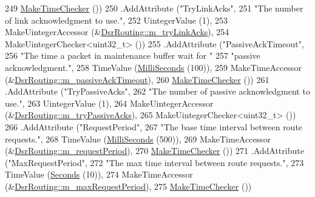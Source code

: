 \begin{DoxyCode}
249                    \hyperlink{group__time_ga7032965bd4afa578691d88c09e4481c1}{MakeTimeChecker} ())
250     .AddAttribute (\textcolor{stringliteral}{"TryLinkAcks"},
251                    \textcolor{stringliteral}{"The number of link acknowledgment to use."},
252                    UintegerValue (1),
253                    MakeUintegerAccessor (&\hyperlink{classns3_1_1dsr_1_1DsrRouting_acecdd106e259c448bcfa6a6cef901658}{DsrRouting::m\_tryLinkAcks}),
254                    MakeUintegerChecker<uint32\_t> ())
255     .AddAttribute (\textcolor{stringliteral}{"PassiveAckTimeout"},
256                    \textcolor{stringliteral}{"The time a packet in maintenance buffer wait for "}
257                    \textcolor{stringliteral}{"passive acknowledgment."},
258                    TimeValue (\hyperlink{group__timecivil_gaf26127cf4571146b83a92ee18679c7a9}{MilliSeconds} (100)),
259                    MakeTimeAccessor (&\hyperlink{classns3_1_1dsr_1_1DsrRouting_a6155bddae63f0e1fda8afbeebc25a54c}{DsrRouting::m\_passiveAckTimeout}),
260                    \hyperlink{group__time_ga7032965bd4afa578691d88c09e4481c1}{MakeTimeChecker} ())
261     .AddAttribute (\textcolor{stringliteral}{"TryPassiveAcks"},
262                    \textcolor{stringliteral}{"The number of passive acknowledgment to use."},
263                    UintegerValue (1),
264                    MakeUintegerAccessor (&\hyperlink{classns3_1_1dsr_1_1DsrRouting_aadd1dd676ec50cae94ffd6f2eefb277c}{DsrRouting::m\_tryPassiveAcks}),
265                    MakeUintegerChecker<uint32\_t> ())
266     .AddAttribute (\textcolor{stringliteral}{"RequestPeriod"},
267                    \textcolor{stringliteral}{"The base time interval between route requests."},
268                    TimeValue (\hyperlink{group__timecivil_gaf26127cf4571146b83a92ee18679c7a9}{MilliSeconds} (500)),
269                    MakeTimeAccessor (&\hyperlink{classns3_1_1dsr_1_1DsrRouting_acb19e2fe8a4cc1812181cdd5491383ee}{DsrRouting::m\_requestPeriod}),
270                    \hyperlink{group__time_ga7032965bd4afa578691d88c09e4481c1}{MakeTimeChecker} ())
271     .AddAttribute (\textcolor{stringliteral}{"MaxRequestPeriod"},
272                    \textcolor{stringliteral}{"The max time interval between route requests."},
273                    TimeValue (\hyperlink{group__timecivil_ga33c34b816f8ff6628e33d5c8e9713b9e}{Seconds} (10)),
274                    MakeTimeAccessor (&\hyperlink{classns3_1_1dsr_1_1DsrRouting_abce8e7bae58dada0db217ca294cb4c6e}{DsrRouting::m\_maxRequestPeriod}),
275                    \hyperlink{group__time_ga7032965bd4afa578691d88c09e4481c1}{MakeTimeChecker} ())

\end{DoxyCode}

